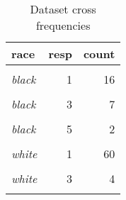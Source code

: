 \begin{table}

\caption{\label{tab:dataset_crosscount}Dataset cross frequencies}
\centering
\begin{tabular}[t]{>{}lrr}
\toprule
race & resp & count\\
\midrule
\em{\cellcolor{gray!6}{black}} & \cellcolor{gray!6}{0} & \cellcolor{gray!6}{119}\\
\em{black} & 1 & 16\\
\em{\cellcolor{gray!6}{black}} & \cellcolor{gray!6}{2} & \cellcolor{gray!6}{12}\\
\em{black} & 3 & 7\\
\em{\cellcolor{gray!6}{black}} & \cellcolor{gray!6}{4} & \cellcolor{gray!6}{3}\\
\addlinespace
\em{black} & 5 & 2\\
\em{\cellcolor{gray!6}{white}} & \cellcolor{gray!6}{0} & \cellcolor{gray!6}{1070}\\
\em{white} & 1 & 60\\
\em{\cellcolor{gray!6}{white}} & \cellcolor{gray!6}{2} & \cellcolor{gray!6}{14}\\
\em{white} & 3 & 4\\
\addlinespace
\em{\cellcolor{gray!6}{white}} & \cellcolor{gray!6}{6} & \cellcolor{gray!6}{1}\\
\bottomrule
\end{tabular}
\end{table}
